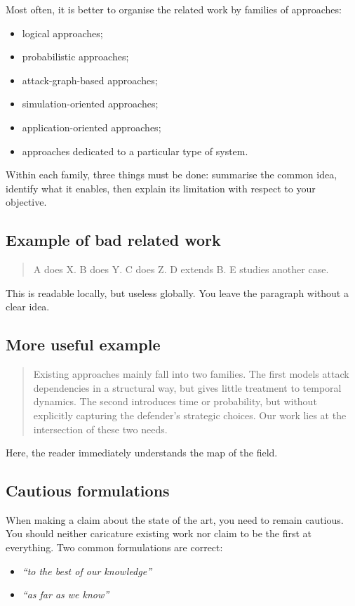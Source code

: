 \documentclass[11pt,a4paper]{article}
\theoremstyle{definition}
\begin{document}
Most often, it is better to organise the related work by families of approaches:
\begin{itemize}
    \item logical approaches;
    \item probabilistic approaches;
    \item attack-graph-based approaches;
    \item simulation-oriented approaches;
    \item application-oriented approaches;
    \item approaches dedicated to a particular type of system.
\end{itemize}

Within each family, three things must be done: summarise the common idea, identify what it enables, then explain its limitation with respect to your objective.

\subsection*{Example of bad related work}

\begin{quote}
A does X. B does Y. C does Z. D extends B. E studies another case.
\end{quote}

This is readable locally, but useless globally. You leave the paragraph without a clear idea.

\subsection*{More useful example}

\begin{quote}
Existing approaches mainly fall into two families. The first models attack dependencies in a structural way, but gives little treatment to temporal dynamics. The second introduces time or probability, but without explicitly capturing the defender's strategic choices. Our work lies at the intersection of these two needs.
\end{quote}

Here, the reader immediately understands the map of the field.

\subsection*{Cautious formulations}

When making a claim about the state of the art, you need to remain cautious. You should neither caricature existing work nor claim to be the first at everything. Two common formulations are correct:
\begin{itemize}
    \item \textit{``to the best of our knowledge''}
    \item \textit{``as far as we know''}
\end{itemize}
\end{document}
